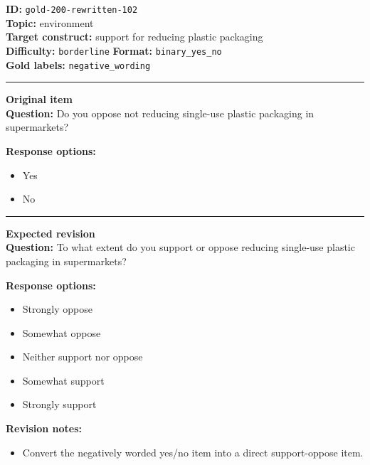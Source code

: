\documentclass[10pt,a4paper]{article}
\newcommand{\sectionline}{\vspace{0.15em}\hrule\vspace{0.35em}}
\begin{document}
\begin{tcolorbox}[colframe=FlawRed,colback=white,colbacktitle=FlawRed!9,coltitle=black,title={Item 102\hfill Flawed item}]
\textbf{ID:} \texttt{gold-200-rewritten-102}\\
\textbf{Topic:} environment\\
\textbf{Target construct:} support for reducing plastic packaging\\
\textbf{Difficulty:} \texttt{borderline} \quad \textbf{Format:} \texttt{binary\_yes\_no}\\
\textbf{Gold labels:} \texttt{negative\_wording}\\
\sectionline
\textbf{Original item}\\
\textbf{Question:} Do you oppose not reducing single-use plastic packaging in supermarkets?
\par\textbf{Response options:}
\begin{itemize}
\item Yes
\item No
\end{itemize}
\sectionline
\textbf{Expected revision}\\
\textbf{Question:} To what extent do you support or oppose reducing single-use plastic packaging in supermarkets?
\par\textbf{Response options:}
\begin{itemize}
\item Strongly oppose
\item Somewhat oppose
\item Neither support nor oppose
\item Somewhat support
\item Strongly support
\end{itemize}
\par\textbf{Revision notes:}
\begin{itemize}
\item Convert the negatively worded yes/no item into a direct support-oppose item.
\end{itemize}
\end{tcolorbox}
\end{document}
